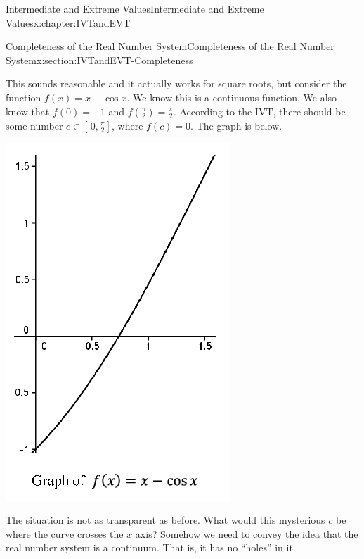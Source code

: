 \begin{chapterptx}{Intermediate and Extreme Values}{}{Intermediate and Extreme Values}{}{}{x:chapter:IVTandEVT}
\begin{sectionptx}{Completeness of the Real Number System}{}{Completeness of the Real Number System}{}{}{x:section:IVTandEVT-Completeness}
		\par
		This sounds reasonable and it actually works for square roots, but consider the function \(f(x)=x-\cos x\). We know this is a continuous function. We also know that \(f(0)=-1\) and \(f(\frac{\pi}{2})=\frac{\pi}{2}\). According to the IVT, there should be some number \(c\in[\,0,\frac{\pi}{2}]\), where \(f(c)=0\). The graph is below.%
		\begin{image}{0.315}{0.37}{0.315}%
			\includegraphics[width=\linewidth]{external/images/Ch6fig2.png}
		\end{image}%
		The situation is not as transparent as before. What would this mysterious \(c\) be where the curve crosses the \(x\) axis? Somehow we need to convey the idea that the real number system is a continuum. That is, it has no ``holes'' in it.%

\end{sectionptx}
\end{chapterptx}
